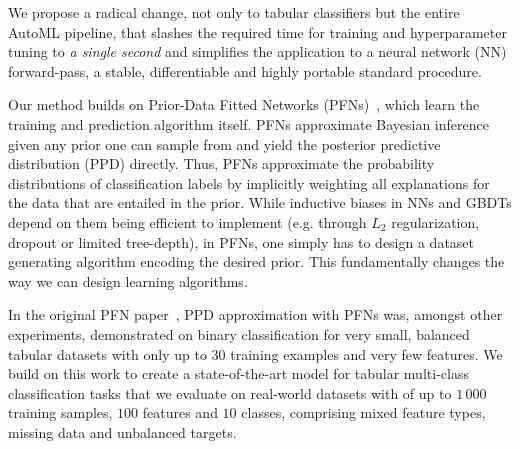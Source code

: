 We propose a radical change, not only to tabular classifiers but the entire AutoML pipeline, that slashes the required time for training and hyperparameter tuning to \textit{a single second} and simplifies the application to a neural network (NN) forward-pass, a stable, differentiable and highly portable standard procedure. %

Our method builds on Prior-Data Fitted Networks (PFNs)~\citep{muller-iclr22a}, which learn the training and prediction algorithm itself.
PFNs approximate Bayesian inference given any prior one can sample from and yield the posterior predictive distribution (PPD) directly. 
Thus, PFNs approximate the probability distributions of classification labels by implicitly weighting all explanations for the data that are entailed in the prior.
While inductive biases in NNs and GBDTs depend on them being efficient to implement (e.g. through $L_2$ regularization, dropout \citep{srivastava14a} or limited tree-depth), in PFNs, one simply has to design a dataset generating algorithm encoding the desired prior. This fundamentally changes the way we can design learning algorithms.

In the original PFN paper~\citep{muller-iclr22a}, PPD approximation with PFNs was, amongst other experiments, demonstrated on binary classification for very small, balanced tabular datasets with only up to $30$ training examples and very few features.
We build on this work to create a state-of-the-art model for tabular multi-class classification tasks that we evaluate on real-world datasets with of up to $1\,000$ training samples, $100$ features and $10$ classes, comprising mixed feature types, missing data and unbalanced targets.

